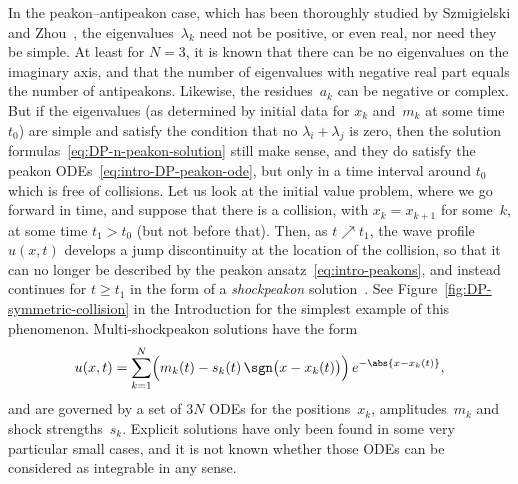 \documentclass[10pt,a4paper]{article} \pdfoutput=1 
\begin{document}
\begin{remark}
  \label{rem:DP-antipeakons}
  In the peakon--antipeakon case, which has been thoroughly studied by Szmigielski and
  Zhou~\cite{szmigielski-zhou:2013:DP-peakon-antipeakon,szmigielski-zhou:2013:DP-colliding-peakons-shock-formation},
  the eigenvalues~$\lambda_k$ need not be positive, or even real,
  nor need they be simple.
  At least for $N=3$, it is known that there can be no eigenvalues on the imaginary axis,
  and that the number of eigenvalues with negative real part equals the number of antipeakons.
  Likewise, the residues~$a_k$ can be negative or complex.
  But if the eigenvalues (as determined by initial data for $x_k$ and~$m_k$ at some time~$t_0$)
  are simple and satisfy the condition that no $\lambda_i + \lambda_j$ is zero,
  then the solution formulas~\eqref{eq:DP-n-peakon-solution}
  still make sense, and they do satisfy the peakon ODEs~\eqref{eq:intro-DP-peakon-ode},
  but only in a time interval around $t_0$ which is free of collisions.
  Let us look at the initial value problem, where we go forward in time,
  and suppose that there is a collision, with $x_k = x_{k+1}$ for some~$k$,
  at some time $t_1 > t_0$ (but not before that).
  Then, as $t \nearrow t_1$,
  the wave profile $u(x,t)$ develops a jump discontinuity at the location of the collision,
  so that it can no longer be described by the peakon ansatz~\eqref{eq:intro-peakons},
  and instead continues for $t \ge t_1$ in the form of a
  \emph{shockpeakon} solution~\cite{lundmark:2007:DP-shockpeakons}.
  See Figure~\ref{fig:DP-symmetric-collision} in the Introduction for the simplest example
  of this phenomenon.
  Multi-shockpeakon solutions have the form
  \begin{equation}
    u(x,t) = \sum_{k=1}^N \Bigl( m_k(t) - s_k(t) \, \sgn\bigl(x - x_k(t) \bigr) \Bigr) \, e^{-\abs{x - x_k(t)}}
    ,
  \end{equation}
  and are governed by a set of $3N$ ODEs for the positions~$x_k$, amplitudes~$m_k$
  and shock strengths~$s_k$.
  Explicit solutions have only been found in some very particular small cases,
  and it is not known whether those ODEs can be considered as integrable in any sense.


\end{remark}
\end{document}
